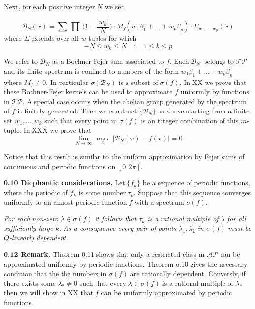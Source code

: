 \documentclass{amsart}
\def\uuu{_}
\def\vvv{-}
\begin{document}
\noindent
Next, for each positive integer $N$ we set

\[ 
\mathcal B\uuu N(x)=
\sum\, \prod\,\bigl(1\vvv \frac{|w\uuu k|}{N})\cdot M\uuu f(
w\uuu 1\beta\uuu 1+
\ldots+w\uuu p\beta\uuu p)\cdot 
E\uuu{w\uuu1,\ldots,w\uuu p}(x)
\]
where $\Sigma$ extends over all $w$\vvv tuples for which
\[ 
\vvv N\leq w\uuu k\leq N\quad\colon\quad 1\leq k\leq p
\]

\noindent
We refer to $\mathcal B\uuu N$ as a Bochner\vvv Fejer sum
associated
to $f$.
Each $\mathcal B\uuu N$ belongs to
$\mathcal {TP}$ and 
its finite spectrum is confined to numbers
of the form
$w\uuu 1\beta\uuu 1+
\ldots+w\uuu p\beta\uuu p$ where  $M\uuu f\neq 0$.
In particular $\sigma(\mathcal B\uuu N)$ is a  subset of
$\sigma(f)$.
In XX we  prove that these  Bochner\vvv Fejer kernels
can be used to approximate $f$ uniformly
by functions in $\mathcal{TP}$.
A special case occurs when
the abelian group generated
by the spectrum of $f$  is finitely generated. Then
we construct $\{\mathcal B\uuu N\}$ as above starting from
a finite set $w\uuu 1,\ldots,w\uuu k$ such that 
every point in $\sigma(f)$ is an integer combination of
this $m$\vvv tuple. In XXX we prove that
\[ 
\lim\uuu{N\to \infty}\, \max\uuu x\,|\mathcal B\uuu N(x)\vvv f(x)|=0\tag{*}
\]

\noindent
Notice   that this result is similar to
the uniform approximation by Fejer sums
of continuous and periodic functions on $[0,2\pi]$.
\medskip

\noindent
{\bf{0.10 Diophantic considerations.}}
Let $\{f\uuu k\}$ be a sequence of periodic functions, where
the periodic of $f\uuu k$ is some number $\tau\uuu k$.
Suppose that this sequence converges uniformly to an almost 
periodic function $f$ with a spectrum $\sigma(f)$.

\medskip

 \emph{For each non\vvv zero
$\lambda\in\sigma(f)$ 
it follows
that $\tau\uuu k$ is a rational multiple of $\lambda$ for all sufficiently
large
$k$.
As a consequence every pair of points
$\lambda\uuu 1,\lambda\uuu 2$ in $\sigma(f)$ must be
$Q$\vvv linearly dependent.}
\bigskip

\noindent
{\bf{0.12 Remark.}}
Theorem 0.11 shows that only a restricted class
in $\mathcal {AP}$\vvv  can
be approximated uniformly
by periodic functions.
Theorem o.10 gives  the  necessary condition  that
the the  numbers in $\sigma(f)$ are rationally dependent.
Conversly, if
there exists some $\lambda\uuu *\neq 0$ such that
every $\lambda\in \sigma(f)$ is a rational multiple of
$\lambda\uuu *$
then
we will show in XX that $f$ can be uniformly approximated by periodic functions.
\end{document}
